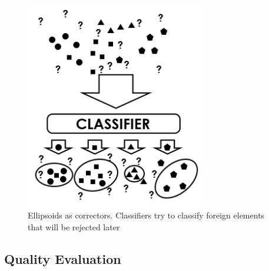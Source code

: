 \documentclass{llncs}
\begin{document}
\begin{figure}[!h]
	\centering
	\includegraphics[width=0.7\textwidth]{_Figures/Classification2.jpg}
	\caption{Ellipsoids as correctors. Classifiers try to classify foreign elements that will be rejected later}
	\label{fig:nativeforeignpatternsClassification2}
\end{figure}


\subsection{Quality Evaluation}
\end{document}
